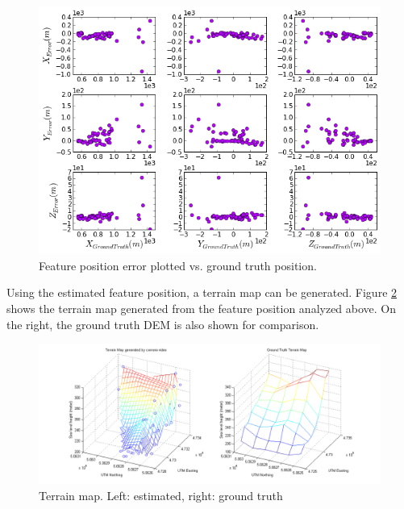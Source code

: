 \begin{figure}[h]
\centering
\includegraphics[width=14cm, keepaspectratio=true]
{./Figures/fltfig/cut1/Figure80.png}
\caption{Feature position error plotted vs. ground truth position. }
\label{fltfig:err_vs_gtpos}
\end{figure}

Using the estimated feature position, a terrain map can be generated.
Figure \ref{fltfig:10} shows the terrain map generated from the
feature position analyzed above. On the right, the ground truth DEM is
also shown for comparison. 

\begin{figure}[h]
\centering
\includegraphics[width=14cm, keepaspectratio=true]
{./Figures/fltfig/cut1/terrain/terrain_map_cmp.png}
\caption{Terrain map. Left: estimated, right: ground truth }
\label{fltfig:10}
\end{figure}
\FloatBarrier

